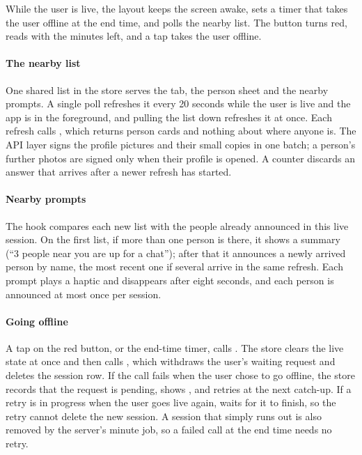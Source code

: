 While the user is live, the  layout keeps the screen awake, sets a timer that takes the user
offline at the end time, and polls the nearby list. The button turns red, reads  with the
minutes left, and a tap takes the user offline.

\paragraph{The nearby list} One shared list in the store serves the  tab, the person sheet and
the nearby prompts. A single poll refreshes it every 20 seconds while the user is live and the app is in
the foreground, and pulling the list down refreshes it at once. Each refresh calls , which
returns person cards and nothing about where anyone is. The API layer signs the profile pictures and their
small copies in one batch; a person's further photos are signed only when their profile is opened. A
counter discards an answer that arrives after a newer refresh has started.

\paragraph{Nearby prompts} The hook  compares each new list with the people already
announced in this live session. On the first list, if more than one person is there, it shows a summary
(``3 people near you are up for a chat''); after that it announces a newly arrived person by name, the
most recent one if several arrive in the same refresh. Each prompt plays a haptic and disappears after
eight seconds, and each person is announced at most once per session.

\paragraph{Going offline} A tap on the red button, or the end-time timer, calls . The store
clears the live state at once and then calls , which withdraws the user's waiting request
and deletes the session row. If the call fails when the user chose to go offline, the store records that
the request is pending, shows , and retries at the next catch-up. If a retry is in
progress when the user goes live again,  waits for it to finish, so the retry cannot delete
the new session. A session that simply runs out is
also removed by the server's minute job, so a failed call at the end time needs no retry.

